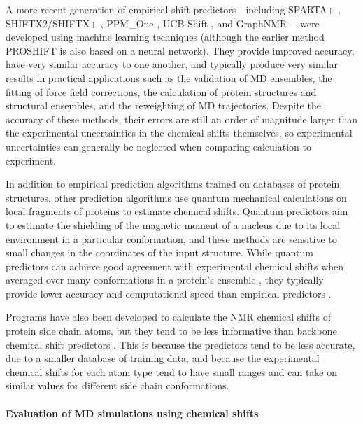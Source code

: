 \documentclass[9pt,review,pubversion]{livecoms}
\begin{document}
A more recent generation of empirical shift predictors---including SPARTA+ \cite{shen_sparta_2010}, SHIFTX2/SHIFTX+ \cite{han_shiftx2_2011}, PPM\_One \cite{li_ppm_one_2015}, UCB-Shift \cite{li_accurate_2020,ptaszek_ucbshift_2024}, and GraphNMR \cite{yang_predicting_2021}---were developed using machine learning techniques (although the earlier method PROSHIFT \cite{meiler_proshift_2003} is also based on a neural network).
They provide improved accuracy, have very similar accuracy to one another, and typically produce very similar results in practical applications such as the validation of MD ensembles, the fitting of force field corrections, the calculation of protein structures and structural ensembles, and the reweighting of MD trajectories.
Despite the accuracy of these methods, their errors are still an order of magnitude larger than the experimental uncertainties in the chemical shifts themselves, so experimental uncertainties can generally be neglected when comparing calculation to experiment.

In addition to empirical prediction algorithms trained on databases of protein structures, other prediction algorithms use quantum mechanical calculations on local fragments of proteins to estimate chemical shifts.
Quantum predictors aim to estimate the shielding of the magnetic moment of a nucleus due to its local environment in a particular conformation, and these methods are sensitive to small changes in the coordinates of the input structure.
While quantum predictors can achieve good agreement with experimental chemical shifts when averaged over many conformations in a protein's ensemble \cite{yi_contribution_2024,yi_predicted_2024}, they typically provide lower accuracy and computational speed than empirical predictors \cite{mulder_nmr_2010,frank_toward_2012,sumowski_sensitivity_2014,fritz_determination_2018,case_using_2020,chandy_accurate_2020}.

Programs have also been developed to calculate the NMR chemical shifts of protein side chain atoms, but they tend to be less informative than backbone chemical shift predictors \cite{han_shiftx2_2011,sahakyan_structure-based_2011,sahakyan_using_2011,li_ppm_one_2015,ptaszek_ucbshift_2024}.
This is because the predictors tend to be less accurate, due to a smaller database of training data, and because the experimental chemical shifts for each atom type tend to have small ranges and can take on similar values for different side chain conformations.

\paragraph{Evaluation of MD simulations using chemical shifts}
\end{document}
